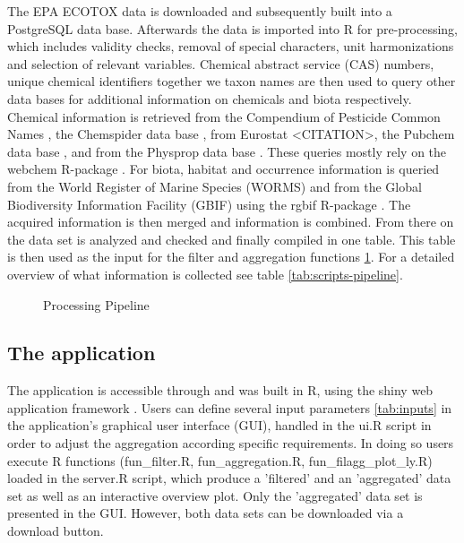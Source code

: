 The EPA ECOTOX data is downloaded and subsequently built into a PostgreSQL data base. Afterwards the data is imported into R for pre-processing, which includes validity checks, removal of special characters, unit harmonizations and selection of relevant variables. Chemical abstract service (CAS) numbers, unique chemical identifiers together we taxon names are then used to query other data bases for additional information on chemicals and biota respectively. Chemical information is retrieved from the Compendium of Pesticide Common Names \citep{CITE_AW}, the Chemspider data base \citep{CITE-CHEMSPIDER}, from Eurostat <CITATION>, the Pubchem data base \citep{CITE_PUBCHEM}, and from the Physprop data base \citep{CITE_PHYSPROP}. These queries mostly rely on the webchem R-package \citep{szocs_webchem_2015-1}. For biota, habitat and occurrence information is queried from the World Register of Marine Species (WORMS) \citep{WORMS} and from the Global Biodiversity Information Facility (GBIF) \citep{CITE_RGBIF} using the rgbif R-package \citep{chamberlain_rgbif_2018}. The acquired information is then merged and information is combined. From there on the data set is analyzed and checked and finally compiled in one table. This table is then used as the input for the filter and aggregation functions \ref{fig:pipeline}. For a detailed overview of what information is collected see table \ref{tab:scripts-pipeline}.

\begin{figure}
    
    \caption{Processing Pipeline}
    \label{fig:pipeline}
\end{figure}


\subsection*{The application}
The application is accessible through \app{} and was built in R, using the shiny web application framework \citep{chang_shiny_2018}. Users can define several input parameters \ref{tab:inputs} in the application's graphical user interface (GUI), handled in the ui.R script in order to adjust the aggregation according specific requirements. In doing so users execute R functions (fun\_filter.R, fun\_aggregation.R, fun\_filagg\_plot\_ly.R) loaded in the server.R script, which produce a 'filtered' and an 'aggregated' data set as well as an interactive overview plot. Only the 'aggregated' data set is presented in the GUI. However, both data sets can be downloaded via a download button.

